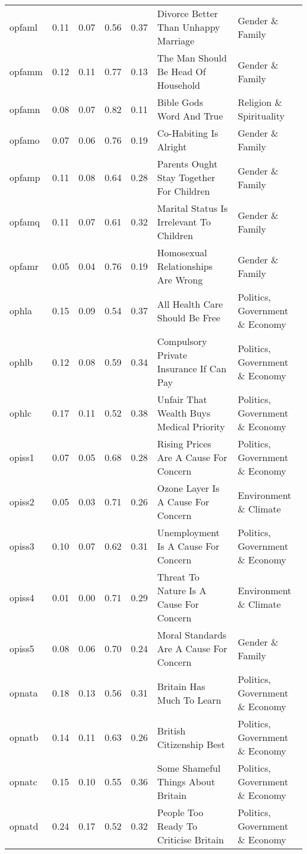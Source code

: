 \begin{longtable}{l|rrrrll}
opfaml & 0.11 & 0.07 & 0.56 & 0.37 & Divorce Better Than Unhappy Marriage & Gender \& Family \\ 
opfamm & 0.12 & 0.11 & 0.77 & 0.13 & The Man Should Be Head Of Household & Gender \& Family \\ 
opfamn & 0.08 & 0.07 & 0.82 & 0.11 & Bible Gods Word And True & Religion \& Spirituality \\ 
opfamo & 0.07 & 0.06 & 0.76 & 0.19 & Co-Habiting Is Alright & Gender \& Family \\ 
opfamp & 0.11 & 0.08 & 0.64 & 0.28 & Parents Ought Stay Together For Children & Gender \& Family \\ 
opfamq & 0.11 & 0.07 & 0.61 & 0.32 & Marital Status Is Irrelevant To Children & Gender \& Family \\ 
opfamr & 0.05 & 0.04 & 0.76 & 0.19 & Homosexual Relationships Are Wrong & Gender \& Family \\ 
ophla & 0.15 & 0.09 & 0.54 & 0.37 & All Health Care Should Be Free & Politics, Government \& Economy \\ 
ophlb & 0.12 & 0.08 & 0.59 & 0.34 & Compulsory Private Insurance If Can Pay & Politics, Government \& Economy \\ 
ophlc & 0.17 & 0.11 & 0.52 & 0.38 & Unfair That Wealth Buys Medical Priority & Politics, Government \& Economy \\ 
opiss1 & 0.07 & 0.05 & 0.68 & 0.28 & Rising Prices Are A Cause For Concern & Politics, Government \& Economy \\ 
opiss2 & 0.05 & 0.03 & 0.71 & 0.26 & Ozone Layer Is A Cause For Concern & Environment \& Climate \\ 
opiss3 & 0.10 & 0.07 & 0.62 & 0.31 & Unemployment Is A Cause For Concern & Politics, Government \& Economy \\ 
opiss4 & 0.01 & 0.00 & 0.71 & 0.29 & Threat To Nature Is A Cause For Concern & Environment \& Climate \\ 
opiss5 & 0.08 & 0.06 & 0.70 & 0.24 & Moral Standards Are A Cause For Concern & Gender \& Family \\ 
opnata & 0.18 & 0.13 & 0.56 & 0.31 & Britain Has Much To Learn & Politics, Government \& Economy \\ 
opnatb & 0.14 & 0.11 & 0.63 & 0.26 & British Citizenship Best & Politics, Government \& Economy \\ 
opnatc & 0.15 & 0.10 & 0.55 & 0.36 & Some Shameful Things About Britain & Politics, Government \& Economy \\ 
opnatd & 0.24 & 0.17 & 0.52 & 0.32 & People Too Ready To Criticise Britain & Politics, Government \& Economy \\ 

\end{longtable}
